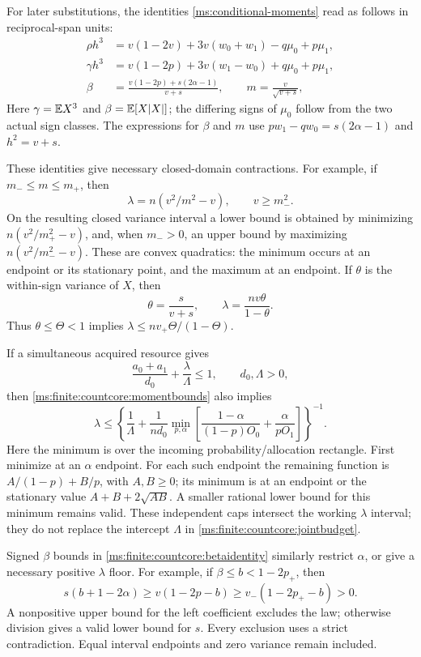 For later substitutions, the identities \eqref{ms:conditional-moments}
read as follows in reciprocal-span units:
\begin{align}
 \rho h^3&=v(1-2v)+3v(w_0+w_1)-q\mu_0+p\mu_1,
       \label{ms:finite:countcore:rhoidentity}\\
 \gamma h^3&=v(1-2p)+3v(w_1-w_0)+q\mu_0+p\mu_1,
       \label{ms:finite:countcore:gammaidentity}\\
 \beta&=\frac{v(1-2p)+s(2\alpha-1)}{v+s},\qquad
 m=\frac v{\sqrt{v+s}},
       \label{ms:finite:countcore:betaidentity}
\end{align}
Here $\gamma=\mathbb E X^3$ and $\beta=\mathbb E[X|X|]$; the differing signs
of $\mu_0$ follow from the two actual sign classes. The expressions for
$\beta$ and $m$ use $pw_1-qw_0=s(2\alpha-1)$ and $h^2=v+s$.

These identities give necessary closed-domain contractions. For example,
if \(m_-\le m\le m_+\), then
\[
 \lambda=n(v^2/m^2-v),\qquad v\ge m_-^2.
\]
On the resulting closed variance interval a lower bound is obtained by
minimizing \(n(v^2/m_+^2-v)\), and, when \(m_->0\), an upper bound
by maximizing \(n(v^2/m_-^2-v)\). These are convex quadratics: the
minimum occurs at an endpoint or its stationary point, and the maximum
at an endpoint. If \(\theta\) is the within-sign variance of \(X\), then
\[
 \theta=\frac{s}{v+s},\qquad
 \lambda=\frac{nv\theta}{1-\theta}.
\]
Thus \(\theta\le\Theta<1\) implies
\(\lambda\le nv_+\Theta/(1-\Theta)\).

If a simultaneous acquired resource gives
\begin{equation}
 \frac{a_0+a_1}{d_0}+\frac\lambda\Lambda\le1,
 \qquad d_0,\Lambda>0,
 \label{ms:finite:countcore:jointbudget}
\end{equation}
then \eqref{ms:finite:countcore:momentbounds} also implies
\[
 \lambda\le
 \left\{\frac1\Lambda+\frac1{nd_0}
 \min_{p,\alpha}\left[
 \frac{1-\alpha}{(1-p)O_0}+\frac\alpha{pO_1}\right]\right\}^{-1}.
\]
Here the minimum is over the incoming probability/allocation rectangle.
First minimize at an \(\alpha\) endpoint. For each such endpoint the
remaining function is \(A/(1-p)+B/p\), with \(A,B\ge0\); its
minimum is at an endpoint or the stationary value
\(A+B+2\sqrt{AB}\). A smaller rational lower bound for this minimum
remains valid. These independent caps intersect the working
\(\lambda\) interval; they do not replace the intercept \(\Lambda\)
in \eqref{ms:finite:countcore:jointbudget}.

Signed \(\beta\) bounds in \eqref{ms:finite:countcore:betaidentity} similarly
restrict \(\alpha\), or give a necessary positive \(\lambda\) floor.
For example, if \(\beta\le b<1-2p_+\), then
\[
 s(b+1-2\alpha)\ge v(1-2p-b)
 \ge v_-(1-2p_+-b)>0.
\]
A nonpositive upper bound for the left coefficient excludes the law;
otherwise division gives a valid lower bound for \(s\).
Every exclusion uses a strict contradiction. Equal interval endpoints
and zero variance remain included.

